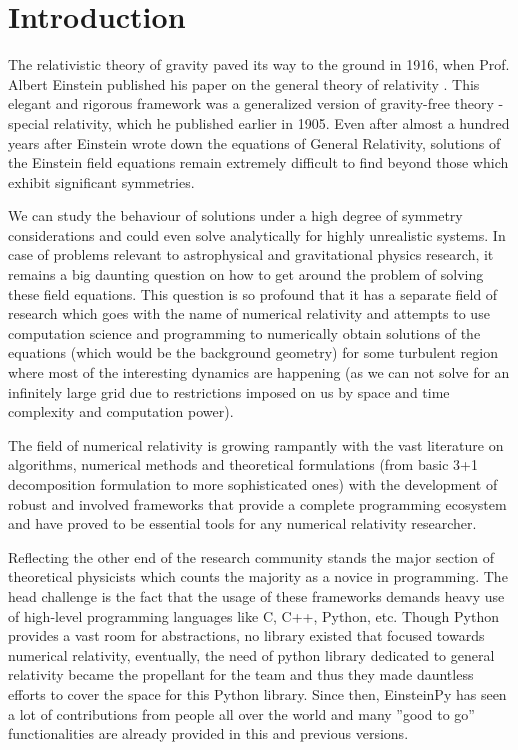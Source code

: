 \documentclass[onecolumn]{aa}
\begin{document}
\section{Introduction}

   The relativistic theory of gravity paved its way to the ground in 1916, 
   when Prof. Albert Einstein published his paper on the general theory of 
   relativity \citeyear{Einstein:1916vd}. This elegant and rigorous framework 
   was a generalized version of gravity-free theory - special relativity, 
   which he published earlier in 1905. Even after almost a hundred years 
   after Einstein wrote down the equations of General Relativity, solutions 
   of the Einstein field equations remain extremely difficult to find beyond 
   those which exhibit significant symmetries.

   We can study the behaviour of solutions under a high degree of symmetry 
   considerations and could even solve analytically for highly unrealistic 
   systems. In case of problems relevant to astrophysical and gravitational 
   physics research, it remains a big daunting question on how to get around 
   the problem of solving these field equations. This question is so profound 
   that it has a separate field of research which goes with the name of numerical  
   relativity and attempts to use computation science and programming to numerically 
   obtain solutions of the equations (which would be the background geometry) 
   for some turbulent region where most of the interesting dynamics are happening 
   (as we can not solve for an infinitely large grid due to restrictions imposed 
   on us by space and time complexity and computation power). 

   The field of numerical relativity is growing rampantly with the vast literature 
   on algorithms, numerical methods and theoretical formulations (from basic 3+1 
   decomposition formulation to more sophisticated ones) with the development of 
   robust and involved frameworks that provide a complete programming ecosystem 
   and have proved to be essential tools for any numerical relativity researcher.
   
   Reflecting the other end of the research community stands the major section 
   of theoretical physicists which counts the majority as a novice in programming. 
   The head challenge is the fact that the usage of these frameworks demands 
   heavy use of high-level programming languages like C, C++, Python, etc. 
   Though Python provides a vast room for abstractions, no library existed that  
   focused towards numerical relativity, eventually, the need of python library  
   dedicated to general relativity became the propellant for the team and thus 
   they made dauntless efforts to cover the space for this Python library. 
   Since then, EinsteinPy has seen a lot of contributions from people all over 
   the world and many ”good to go” functionalities are already provided in 
   this and previous versions.
   
\end{document}
